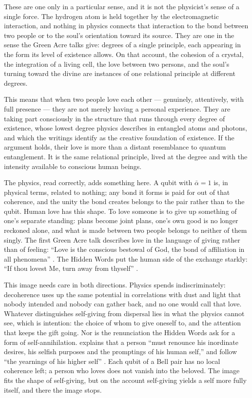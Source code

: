These are one only in a particular sense, and it is not the physicist's sense of a single force. The hydrogen atom is held together by the electromagnetic interaction, and nothing in physics connects that interaction to the bond between two people or to the soul's orientation toward its source. They are one in the sense the Green Acre talks give: degrees of a single principle, each appearing in the form its level of existence allows. On that account, the cohesion of a crystal, the integration of a living cell, the love between two persons, and the soul's turning toward the divine are instances of one relational principle at different degrees.

This means that when two people love each other — genuinely, attentively, with full presence — they are not merely having a personal experience. They are taking part consciously in the structure that runs through every degree of existence, whose lowest degree physics describes in entangled atoms and photons, and which the \bahai writings identify as the creative foundation of existence. If the argument holds, their love is more than a distant resemblance to quantum entanglement. It is the same relational principle, lived at the degree and with the intensity available to conscious human beings.

The physics, read correctly, adds something here. A qubit with $\bar{\alpha} = 1$ is, in physical terms, related to nothing; any bond it forms is paid for out of that coherence, and the unity the bond creates belongs to the pair rather than to the qubit. Human love has this shape. To love someone is to give up something of one's separate standing: plans become joint plans, one's own good is no longer reckoned alone, and what is made between two people belongs to neither of them singly. The first Green Acre talk describes love in the language of giving rather than of feeling: ``Love is the conscious bestowal of God, the bond of affiliation in all phenomena'' \citep[Talk 89]{PUP}. The Hidden Words put the human side of the exchange starkly: ``If thou lovest Me, turn away from thyself'' \citep[Arabic no.~7]{HiddenWords}.

This image needs care in both directions. Physics spends indiscriminately: decoherence uses up the same potential in correlations with dust and light that nobody intended and nobody can gather back, and no one would call that love. Whatever distinguishes self-giving from dispersal lies in what the physics cannot see, which is intention: the choice of whom to give oneself to, and the attention that keeps the gift going. Nor is the renunciation the Hidden Words ask for a form of self-annihilation. \AbdulBaha explains that a person ``must renounce his inordinate desires, his selfish purposes and the promptings of his human self,'' and follow ``the yearnings of his higher self'' \citep[\S 181]{SelectionsAbdul}. Each qubit of a Bell pair has no local coherence left; a person who loves does not vanish into the beloved. The image fits the shape of self-giving, but on the \bahai account self-giving yields a self more fully itself, and there the image stops.

